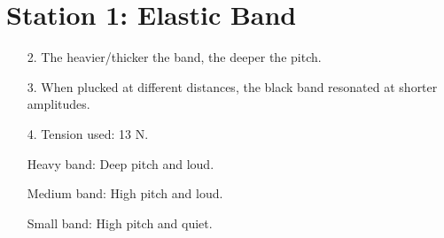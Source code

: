 


\graphicspath{ {./lab09images/} }


\renewcommand\assignment{Lab 9, Day 1: An exploration and discussion of Natural Frequency and Resonance, 3/28/2023, Partners: Maite Valentin-Lugo, Seth Waln}

    \section*{Station 1: Elastic Band}

    \begin{itemize}
        \item [2.] The heavier/thicker the band, the deeper the pitch.
        \item [3.] When plucked at different distances, the black band resonated at shorter amplitudes.
        \item [4.] Tension used: 13 N.
        
        Heavy band: Deep pitch and loud.

        Medium band: High pitch and loud.

        Small band: High pitch and quiet.
    \end{itemize}

